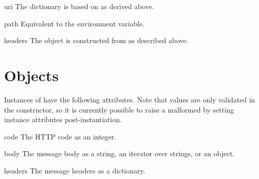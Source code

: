 \begin{datadesc}{uri}
The dictionary is based on  as derived above.
\end{datadesc}

\begin{datadesc}{path}
Equivalent to the  environment variable.
\end{datadesc}

\begin{datadesc}{headers}
The  object is constructed from  as described
above.
\end{datadesc}


\begin{seealso}
\end{seealso}



\section{ Objects}

Instances of  have the following attributes. Note that
values are only validated in the constructor, so it is currently possible to
raise a malformed  by setting instance attributes
post-instantiation.

\begin{datadesc}{code}
The HTTP code as an integer.
\end{datadesc}

\begin{datadesc}{body}
The message body as a string, an iterator over strings, or an
 object.
\end{datadesc}

\begin{datadesc}{headers}
The message headers as a dictionary.
\end{datadesc}



\section{}
\section{}



